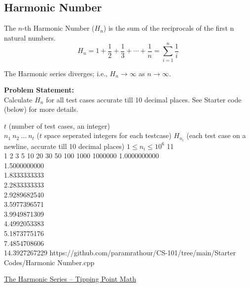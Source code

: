 \documentclass[../../Problems]{subfiles}
\begin{document}
\subsection{Harmonic Number}{\label{pp:harmonic}}
The $n$-th Harmonic Number ($H_n$) is the sum of the reciprocals of the first n natural numbers.
\begin{equation}
{H_{n}=1+{\frac {1}{2}}+{\frac {1}{3}}+\cdots +{\frac {1}{n}}=\sum _{i=1}^{n}{\frac {1}{i}}}
\end{equation}
\begin{fact}
The Harmonic series diverges; i.e., $H_n \rightarrow\infty$ as $n\rightarrow\infty$.
\end{fact}
\textbf{Problem Statement:}\\
Calculate $H_n$ for all test cases accurate till 10 decimal places. See Starter code (below) for more details.
\begin{testcases}
	{$t$ \hfill(number of test cases, an integer)\\
	$n_1\ n_2\ \ldots\ n_t$ \hfill($t$ space seperated integers for each testcase)}
	{$H_{n_i}$ \hfill(each test case on a newline, accurate till 10 decimal places)}
	{$1 \leq n_i \leq 10^{6}$}
	{11\\1 2 3 5 10 20 30 50 100 1000 1000000}
	{1.0000000000\\1.5000000000\\1.8333333333\\2.2833333333\\2.9289682540\\3.5977396571\\3.9949871309\\4.4992053383\\5.1873775176\\7.4854708606\\14.3927267229}
	{https://github.com/paramrathour/CS-101/tree/main/Starter Codes/Harmonic Number.cpp}
\end{testcases}
\begin{funvideo}
\href{https://youtu.be/Dgcoa2yAUfw}{The Harmonic Series -- Tipping Point Math}
\end{funvideo}
\end{document}
